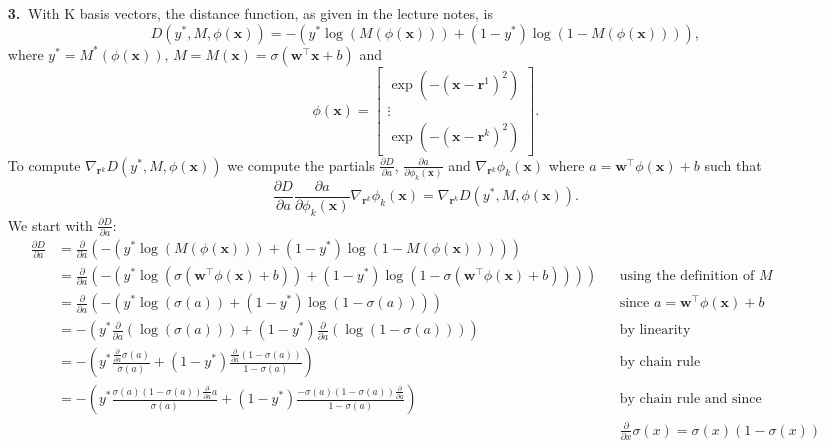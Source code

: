 \documentclass [10pt]{article}
\begin{document}
\begin{enumerate}
	\item[\textbf{3.$\>$}]With K basis vectors, the distance function, as given in the lecture notes, is$$D(y^{*},M,\phi(\textbf{x}))=-(y^{*}\log(M(\phi(\textbf{x})))+(1-y^{*})\log(1-M(\phi(\textbf{x})))),$$where $y^{*}=M^{*}(\phi(\textbf{x}))$, $M = M(\textbf{x}) = \sigma(\textbf{w}^{\top}\textbf{x}+b)$ and
	\[
	\phi(\textbf{x}) =
	\begin{bmatrix}
		\exp(-(\textbf{x}-\textbf{r}^{1})^{2}) \\
		\vdots \\
		\exp(-(\textbf{x}-\textbf{r}^{k})^{2})
	\end{bmatrix}.
	\]
	To compute $\nabla_{\textbf{r}^{k}}D(y^{*},M,\phi(\textbf{x}))$ we compute the partials $\frac{\partial D}{\partial a}$, $\frac{\partial a}{\partial \phi_{k}(\textbf{x})}$ and $\nabla_{\textbf{r}^{k}} \phi_{k}(\textbf{x})$ where $a=\textbf{w}^{\top}\phi(\textbf{x})+b$ such that $$\frac{\partial D}{\partial a} \frac{\partial a}{\partial \phi_{k}(\textbf{x})} \nabla_{\textbf{r}^{k}} \phi_{k}(\textbf{x}) = \nabla_{\textbf{r}^{k}}D(y^{*},M,\phi(\textbf{x})).$$We start with $\frac{\partial D}{\partial a}$:
	\begin{align}
		\frac{\partial D}{\partial a} &= \frac{\partial}{\partial a} (-(y^{*}\log(M(\phi(\textbf{x})))+(1-y^{*})\log(1-M(\phi(\textbf{x}))))) \nonumber \\
		&= \frac{\partial}{\partial a} (-(y^{*}\log(\sigma(\textbf{w}^{\top}\phi(\textbf{x})+b))+(1-y^{*})\log(1-\sigma(\textbf{w}^{\top}\phi(\textbf{x})+b)))) && \text{using the definition of $M$} \nonumber\\
		&= \frac{\partial}{\partial a} (-(y^{*}\log(\sigma(a))+(1-y^{*})\log(1-\sigma(a)))) && \text{since $a = \textbf{w}^{\top}\phi(\textbf{x})+b$} \nonumber \\
		&= -(y^{*}\frac{\partial}{\partial a}(\log(\sigma(a)))+(1-y^{*})\frac{\partial}{\partial a}(\log(1-\sigma(a)))) && \text{by linearity} \nonumber \\
		&= -(y^{*}\frac{\frac{\partial}{\partial a} \sigma(a)}{\sigma(a)}+(1-y^{*})\frac{\frac{\partial}{\partial a} (1- \sigma(a))}{1-\sigma(a)}) && \text{by chain rule} \nonumber \\
		&= -(y^{*}\frac{\sigma(a)(1-\sigma(a))\frac{\partial}{\partial a} a}{\sigma(a)}+(1-y^{*})\frac{-\sigma(a)(1-\sigma(a)) \frac{\partial}{\partial a}}{1-\sigma(a)}) && \text{by chain rule and since} \nonumber \\
		& && \text{$\frac{\partial}{\partial x}\sigma(x) = \sigma(x)(1-\sigma(x))$} \nonumber \\

\end{align}
\end{enumerate}
\end{document}
